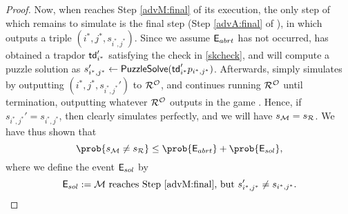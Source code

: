 \begin{proof}
  Now, when \redM reaches Step \ref{advM:final} of its execution,
  the only step of \advA which remains to simulate is the
  final step (Step \ref{advA:final} of \advA), in which \advA outputs
  a triple \((i^{*},j^{*},s_{i^{*},j^{*}})\).
  Since we assume \(\mathsf{E}_{abrt}\) has not occurred,
  \redM has obtained a trapdor \(\mathsf{td}_{i^{*}}'\)
  satisfying the check in \eqref{skcheck},
  and will compute a puzzle solution as
  \(s_{i^{*},{j^{*}}}' \leftarrow \mathsf{PuzzleSolve}(\mathsf{td}_{i^{*}}'p_{i^{*},j^{*}})\).
  Afterwards, \redM simply simulates \advA
  by outputting \((i^{*},j^{*}, s_{i^{*},j^{*}}')\) to \(\redR^{\oracle}\),
  and continues running \(\redR^{\oracle}\)
  until termination, outputting whatever \(\redR^{\oracle}\)
  outputs in the game \SICA.
  Hence, if \(s_{i^{*},j^{*}}' = s_{i^{*},j^{*}}\),
  then clearly \redM simulates \advA perfectly,
  and we will have \(s_{\redM} = s_{\redR}\).
  We have thus shown that
  \[
    \prob{s_{\redM} \ne s_{\redR}} \le \prob{\eventE_{abrt}} + \prob{\eventE_{sol}},
  \]
  where we define the event \(\mathsf{E}_{sol}\) by
  \[
    \eventE_{sol} := \text{\redM reaches Step \ref{advM:final}, but } s_{i^{*},j^{*}}' \ne s_{i^{*},j^{*}}.
  \]


\end{proof}
